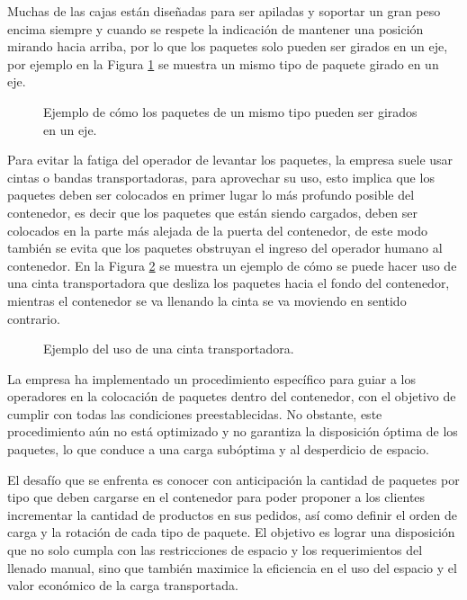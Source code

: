 Muchas de las cajas están diseñadas para ser apiladas y soportar un gran peso encima siempre y cuando se respete la indicación de mantener una posición mirando hacia arriba, por lo que los paquetes solo pueden ser girados en un eje, por ejemplo en la Figura \ref{fig:paquetes_girados} se muestra un mismo tipo de paquete girado en un eje.

\begin{figure}[H]
    \centering
    
    \caption{Ejemplo de cómo los paquetes de un mismo tipo pueden ser girados en un eje.}
    \label{fig:paquetes_girados}
\end{figure}

Para evitar la fatiga del operador de levantar los paquetes, la empresa suele usar cintas o bandas transportadoras, para aprovechar su uso, esto implica que los paquetes deben ser colocados en primer lugar lo más profundo posible del contenedor, es decir que los paquetes que están siendo cargados, deben ser colocados en la parte más alejada de la puerta del contenedor, de este modo también se evita que los paquetes obstruyan el ingreso del operador humano al contenedor. En la Figura \ref{fig:cinta_transportadora} se muestra un ejemplo de cómo se puede hacer uso de una cinta transportadora que desliza los paquetes hacia el fondo del contenedor, mientras el contenedor se va llenando la cinta se va moviendo en sentido contrario.

\begin{figure}[H]
    \centering
    
    \caption{Ejemplo del uso de una cinta transportadora.}
    \label{fig:cinta_transportadora}
\end{figure}

La empresa ha implementado un procedimiento específico para guiar a los operadores en la colocación de paquetes dentro del contenedor, con el objetivo de cumplir con todas las condiciones preestablecidas. No obstante, este procedimiento aún no está optimizado y no garantiza la disposición óptima de los paquetes, lo que conduce a una carga subóptima y al desperdicio de espacio.

El desafío que se enfrenta es conocer con anticipación la cantidad de paquetes por tipo que deben cargarse en el contenedor para poder proponer a los clientes incrementar la cantidad de productos en sus pedidos, así como definir el orden de carga y la rotación de cada tipo de paquete. El objetivo es lograr una disposición que no solo cumpla con las restricciones de espacio y los requerimientos del llenado manual, sino que también maximice la eficiencia en el uso del espacio y el valor económico de la carga transportada.

